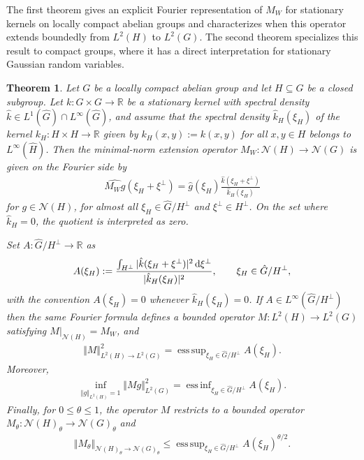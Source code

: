 \documentclass{article}
\renewcommand{\d}{\, \textup{d}}
\newtheorem{theorem}{Theorem}[section]
\newcommand{\R}{\mathbb{R}}
\DeclareMathOperator*{\esssup}{ess\,sup}
\DeclareMathOperator*{\essinf}{ess\,inf}
\begin{document}
The first theorem gives an explicit Fourier representation of $M_W$ for stationary kernels on locally compact abelian groups and characterizes when this operator extends boundedly from $L^2(H)$ to $L^2(G)$. The second theorem specializes this result to compact groups, where it has a direct interpretation for stationary Gaussian random variables.
\begin{theorem}\label{Theorem:MainResult}
    Let $G$ be a locally compact abelian group and let $H\subseteq G$ be a closed subgroup. Let $k:G\times G \to \R$ be a stationary kernel with spectral density $\hat{k} \in L^1(\hat{G}) \cap L^\infty(\hat{G})$, and assume that the spectral density $\hat{k}_H(\xi_H)$ of the kernel $k_H:H \times H \to \R$ given by $k_H(x,y):=k(x,y)$ for all $x,y \in H$ belongs to $ L^\infty(\hat{H})$. Then the minimal-norm extension operator $M_W: \mathcal{N}(H) \to \mathcal{N}(G)$ is given on the Fourier side by 
    \begin{align*}
        \widehat{M_W g}(\xi_H+\xi^\perp) = \hat{g}(\xi_H) \frac{\hat k(\xi_H+\xi^\perp)}
{\hat k_H(\xi_H)} 
    \end{align*}
    for $g \in \mathcal{N}(H)$, for almost all $\xi_H \in \hat{G}/H^\perp$ and $\xi^\perp \in H^\perp$. On the set where $\hat{k}_H=0$, the quotient is interpreted as zero.  

    Set $A:\hat{G}/H^\perp \to \R$ as
    \begin{align*}
        A(\xi_H):= \frac{
\int_{H^\perp}
|\hat k(\xi_H+\xi^\perp)|^2 \d\xi^\perp
}{
|\hat k_H(\xi_H)|^2
},
\qquad
\xi_H\in \hat G/H^\perp,
    \end{align*}
with the convention $A(\xi_H)=0$ whenever $\hat{k}_H(\xi_H)=0$. If $A \in L^\infty(\hat{G}/H^\perp)$ then the same Fourier formula defines a bounded operator $M:L^2(H) \to L^2(G)$ satisfying $M|_{\mathcal{N}(H)}=M_W$, and 
\begin{align*}
    \Vert M \Vert_{L^2(H) \to L^2(G)}^2 = \esssup_{\xi_H \in \hat{G}/H^\perp} A(\xi_H).
\end{align*}
Moreover, 
\begin{align*}
    \inf_{ \Vert g \Vert_{L^2(H)}=1} \Vert M g \Vert_{L^2(G)}^2 = \essinf_{\xi_H \in \hat{G}/H^\perp} A(\xi_H).
\end{align*}
Finally, for $0 \leq \theta \leq 1$, the operator $M$ restricts to a bounded operator $M_\theta:\mathcal{N}(H)_\theta \to \mathcal{N}(G)_\theta$ and 
\begin{align*}
\Vert M_\theta \Vert_{\mathcal{N}(H)_\theta \to \mathcal{N}(G)_\theta} \leq \esssup_{\xi_H \in \hat{G}/H^\perp} A(\xi_H)^{\theta/2}.
\end{align*}
\end{theorem}
\end{document}
